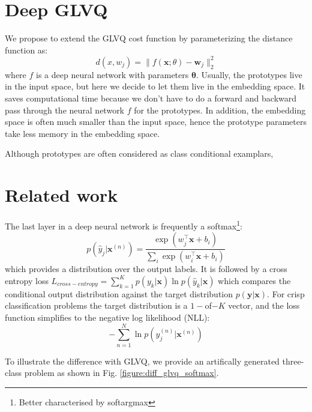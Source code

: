 \documentclass{esannV2}
\begin{document}
\section{Deep GLVQ}
We propose to extend the GLVQ cost function by parameterizing the distance function as:
\begin{equation}
 d(x, w_j) = \|f(\mathbf{x}; \theta) - \mathbf{w}_j\|^2_2
\end{equation}
where $f$ is a deep neural network with parameters $\mathbf{\theta}$. Usually, the prototypes live in the input space, but here we decide to let them live in the embedding space. It saves computational time because we don't have to do a forward and backward pass through the neural network $f$ for the prototypes. In addition, the embedding space is often much smaller than the input space, hence the prototype parameters take less memory in the embedding space. 

Although prototypes are often considered as class conditional examplars,  

\section{Related work}
The last layer in a deep neural network is frequently a softmax\footnote{Better characterised by softargmax}:
\begin{equation}
p(\hat{y}_j| \mathbf{x}^{(n)}) = \frac{\exp(w_j^\top \mathbf{x} + b_i)}{\sum_i \exp(w_i^\top \mathbf{x} + b_i)}
\end{equation}
which provides a distribution over the output labels. It is followed by a cross entropy loss $L_{cross-entropy} = \sum_{k=1}^K p(y_k|\mathbf{x}) \ln p(\hat{y}_k|\mathbf{x})$ which compares the conditional output distribution against the target distribution $p(\mathbf{y}|\mathbf{x})$. For crisp classification problems the target distribution is a $1-$of$-K$ vector, and the loss function simplifies to the negative log likelihood (NLL):
\begin{equation}
 - \sum_{n=1}^N \ln p(\hat{y}^{(n)}_j|\mathbf{x}^{(n)})
\end{equation}

To illustrate the difference with GLVQ, we provide an artifically generated three-class problem as shown in Fig. \ref{figure:diff_glvq_softmax}. 
\end{document}

